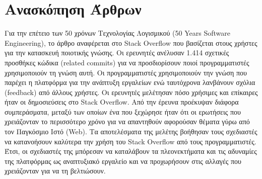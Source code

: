 \documentclass[11pt]{article}
\begin{document}
	\section*{Ανασκόπηση Άρθρων}
	Για την επέτειο των 50 χρόνων Τεχνολογίας Λογισμικού (\foreignlanguage{english}{50 Years Software Engineering}), το άρθρο \cite{abdalkareem2017developers} αναφέρεται στο \foreignlanguage{english}{Stack Overflow} που βασίζεται στους χρήστες για την κατασκευή ποιοτικής γνώσης. Oι ερευνητές ανέλυσαν 1.414 σχετικές προσθήκες κώδικα (\foreignlanguage{english}{related commits}) για να προσδιορίσουν ποιοί προγραμματιστές χρησιμοποιούν τη γνώση αυτή. Οι προγραμματιστές χρησιμοποιούν την γνώση που παρέχει η πλατφόρμα για την ανάπτυξη εργαλείων ενώ ταυτόχρονα λανβάνουν σχόλια  (\foreignlanguage{english}{feedback}) από άλλους χρήστες. Οι ερευνητές μελέτησαν πόσο χρήσιμες και επίκαιρες ήταν οι δημοσιεύσεις στο \foreignlanguage{english}{Stack Overflow}. Από την έρευνα προέκυψαν διάφορα συμπεράσματα, μεταξύ των οποίων ένα που ξεχώρησε ήταν ότι οι ερωτήσεις που χρειάζονταν το περισσότερο χρόνο για να απαντηθούν αφορούσαν θέματα γύρω από τον Παγκόσμιο Ιστό (\foreignlanguage{english}{Web}). Τα αποτελέσματα της μελέτης βοήθησαν τους σχεδιαστές να κατανοήσουν καλύτερα την χρήση του \foreignlanguage{english}{Stack Overflow} από τους προγραμματιστές. Έτσι, οι σχεδιαστές της μπόρεσαν να καταλάβουν τα πλεονεκτήματα και τις αδυναμίες της πλατφόρμας ως αναπτυξιακό εργαλείο και να προχωρήσουν στις αλλαγές που χρειάζονταν για να τη βελτιώσουν.
	\par
\end{document}
